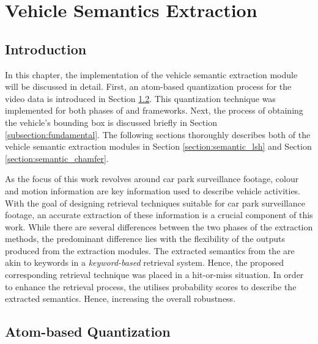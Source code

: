 \chapter{Vehicle Semantics Extraction}

\label{section:semanticsextraction}


\section{Introduction}

In this chapter, the implementation of the vehicle semantic extraction module will be discussed in detail.
First, an atom-based quantization process for the video data is introduced in Section \ref{section:atoms}. This quantization technique was implemented for both phases of \versionOneExt and \versionTwoExt frameworks. Next, the process of obtaining the vehicle's bounding box is discussed briefly in Section \ref{subsection:fundamental}.
The following sections thoroughly describes both of the vehicle semantic extraction modules in Section \ref{section:semantic_lsh} and Section \ref{section:semantic_chamfer}.


As the focus of this work revolves around car park surveillance footage, colour and motion information are key information used to describe vehicle activities. With the goal of designing retrieval techniques suitable for car park surveillance footage, an accurate extraction of these information is a crucial component of this work.
While there are several differences between the two phases of the extraction methods, the predominant difference lies with the flexibility of the outputs produced from the extraction modules.
The extracted semantics from the \versionOneExt are akin to keywords in a \textit{keyword-based} retrieval system. Hence, the proposed corresponding retrieval technique was placed in a hit-or-miss situation. In order to enhance the retrieval process, the \versionTwoExt utilises probability scores to describe the extracted semantics. Hence, increasing the overall robustness.



\section{Atom-based Quantization}
\label{section:atoms}

